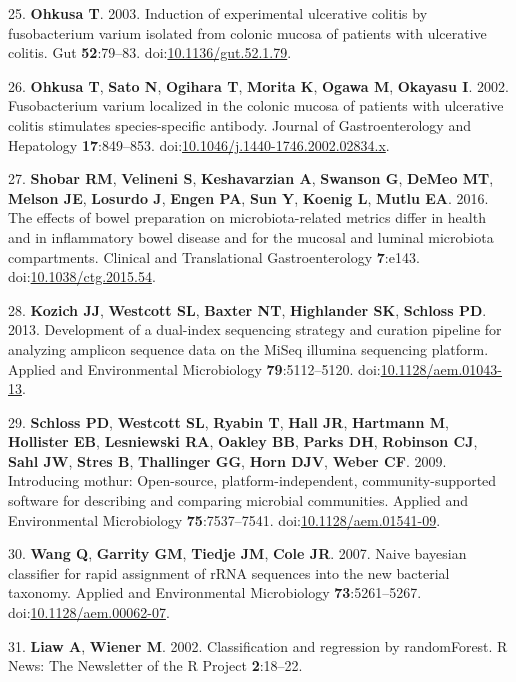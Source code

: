 \documentclass[11pt,]{article}
\begin{document}
\hypertarget{ref-Ohkusa2003}{}
25. \textbf{Ohkusa T}. 2003. Induction of experimental ulcerative
colitis by fusobacterium varium isolated from colonic mucosa of patients
with ulcerative colitis. Gut \textbf{52}:79--83.
doi:\href{https://doi.org/10.1136/gut.52.1.79}{10.1136/gut.52.1.79}.

\hypertarget{ref-Ohkusa2002}{}
26. \textbf{Ohkusa T}, \textbf{Sato N}, \textbf{Ogihara T},
\textbf{Morita K}, \textbf{Ogawa M}, \textbf{Okayasu I}. 2002.
Fusobacterium varium localized in the colonic mucosa of patients with
ulcerative colitis stimulates species-specific antibody. Journal of
Gastroenterology and Hepatology \textbf{17}:849--853.
doi:\href{https://doi.org/10.1046/j.1440-1746.2002.02834.x}{10.1046/j.1440-1746.2002.02834.x}.

\hypertarget{ref-Shobar2016}{}
27. \textbf{Shobar RM}, \textbf{Velineni S}, \textbf{Keshavarzian A},
\textbf{Swanson G}, \textbf{DeMeo MT}, \textbf{Melson JE},
\textbf{Losurdo J}, \textbf{Engen PA}, \textbf{Sun Y}, \textbf{Koenig
L}, \textbf{Mutlu EA}. 2016. The effects of bowel preparation on
microbiota-related metrics differ in health and in inflammatory bowel
disease and for the mucosal and luminal microbiota compartments.
Clinical and Translational Gastroenterology \textbf{7}:e143.
doi:\href{https://doi.org/10.1038/ctg.2015.54}{10.1038/ctg.2015.54}.

\hypertarget{ref-Kozich2013}{}
28. \textbf{Kozich JJ}, \textbf{Westcott SL}, \textbf{Baxter NT},
\textbf{Highlander SK}, \textbf{Schloss PD}. 2013. Development of a
dual-index sequencing strategy and curation pipeline for analyzing
amplicon sequence data on the MiSeq illumina sequencing platform.
Applied and Environmental Microbiology \textbf{79}:5112--5120.
doi:\href{https://doi.org/10.1128/aem.01043-13}{10.1128/aem.01043-13}.

\hypertarget{ref-Schloss2009}{}
29. \textbf{Schloss PD}, \textbf{Westcott SL}, \textbf{Ryabin T},
\textbf{Hall JR}, \textbf{Hartmann M}, \textbf{Hollister EB},
\textbf{Lesniewski RA}, \textbf{Oakley BB}, \textbf{Parks DH},
\textbf{Robinson CJ}, \textbf{Sahl JW}, \textbf{Stres B},
\textbf{Thallinger GG}, \textbf{Horn DJV}, \textbf{Weber CF}. 2009.
Introducing mothur: Open-source, platform-independent,
community-supported software for describing and comparing microbial
communities. Applied and Environmental Microbiology
\textbf{75}:7537--7541.
doi:\href{https://doi.org/10.1128/aem.01541-09}{10.1128/aem.01541-09}.

\hypertarget{ref-Wang2007}{}
30. \textbf{Wang Q}, \textbf{Garrity GM}, \textbf{Tiedje JM},
\textbf{Cole JR}. 2007. Naive bayesian classifier for rapid assignment
of rRNA sequences into the new bacterial taxonomy. Applied and
Environmental Microbiology \textbf{73}:5261--5267.
doi:\href{https://doi.org/10.1128/aem.00062-07}{10.1128/aem.00062-07}.

\hypertarget{ref-Liaw2002}{}
31. \textbf{Liaw A}, \textbf{Wiener M}. 2002. Classification and
regression by randomForest. R News: The Newsletter of the R Project
\textbf{2}:18--22.
\end{document}
